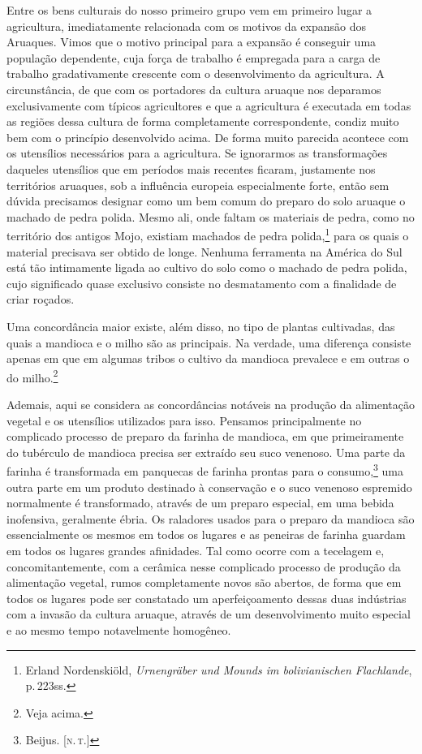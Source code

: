 Entre os bens culturais do nosso primeiro grupo vem em primeiro lugar a
agricultura, imediatamente relacionada com os motivos da expansão dos
Aruaques. Vimos que o motivo principal para a expansão é conseguir uma
população dependente, cuja força de trabalho é empregada para a carga de
trabalho gradativamente crescente com o desenvolvimento da agricultura.
A circunstância, de que com os portadores da cultura aruaque nos
deparamos exclusivamente com típicos agricultores e que a agricultura é
executada em todas as regiões dessa cultura de forma completamente
correspondente, condiz muito bem com o princípio desenvolvido acima. De
forma muito parecida acontece com os utensílios necessários para a
agricultura. Se ignorarmos as transformações daqueles utensílios que em
períodos mais recentes ficaram, justamente nos territórios aruaques, sob
a influência europeia especialmente forte, então sem dúvida precisamos
designar como um bem comum do preparo do solo aruaque o machado de pedra
polida. Mesmo ali, onde faltam os materiais de pedra, como no território
dos antigos Mojo, existiam machados de pedra polida,\footnote{Erland
  Nordenskiöld, \textit{Urnengräber und Mounds im bolivianischen Flachlande}, p.\,223ss.} 
  para os quais o material precisava ser obtido de
longe. Nenhuma ferramenta na América do Sul está tão intimamente ligada
ao cultivo do solo como o machado de pedra polida, cujo significado
quase exclusivo consiste no desmatamento com a finalidade de criar
roçados.

Uma concordância maior existe, além disso, no tipo de plantas
cultivadas, das quais a mandioca e o milho são as principais. Na
verdade, uma diferença consiste apenas em que em algumas tribos o
cultivo da mandioca prevalece e em outras o do milho.\footnote{Veja
  acima.}

Ademais, aqui se considera as concordâncias notáveis na produção da
alimentação vegetal e os utensílios utilizados para isso. Pensamos
principalmente no complicado processo de preparo da farinha de
mandioca, em que primeiramente do tubérculo de mandioca precisa ser
extraído seu suco venenoso. Uma parte da farinha é transformada em
panquecas de farinha prontas para o consumo,\footnote{Beijus. {[}\textsc{n.\,t.}{]}} uma
outra parte em um produto destinado à conservação e o suco venenoso
espremido normalmente é transformado, através de um preparo especial, em
uma bebida inofensiva, geralmente ébria. Os raladores usados para o
preparo da mandioca são essencialmente os mesmos em todos os lugares e
as peneiras de farinha guardam em todos os lugares grandes afinidades.
Tal como ocorre com a tecelagem e, concomitantemente, com a cerâmica
nesse complicado processo de produção da alimentação vegetal, rumos
completamente novos são abertos, de forma que em todos os lugares pode
ser constatado um aperfeiçoamento dessas duas indústrias com a invasão
da cultura aruaque, através de um desenvolvimento muito especial e ao
mesmo tempo notavelmente homogêneo.

